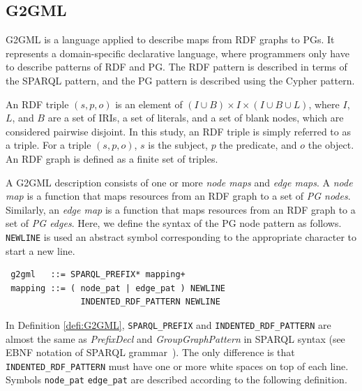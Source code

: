 \documentclass[runningheads]{llncs}
\begin{document}
\subsection{G2GML}

G2GML is a language applied to describe maps from RDF graphs to PGs. It represents a domain-specific declarative language, where programmers only have to describe patterns of RDF and PG. The RDF pattern is described in terms of the SPARQL pattern, and the PG pattern is described using the Cypher pattern.

\begin{prel}
An RDF triple $(s, p, o)$ is an element of $(I \cup B) \times I \times (I \cup B \cup L)$, where $I$, $L$, and $B$ are a set of IRIs, a set of literals, and a set of blank nodes, which are considered pairwise disjoint. In this study, an RDF triple is simply referred to as a triple. For a triple $(s, p, o)$, $s$ is the subject, $p$ the predicate, and $o$ the object. An RDF graph is defined as a finite set of triples.
\end{prel}

\par
A G2GML description consists of one or more \textit{node maps} and \textit{edge maps}.
A \textit{node map} is a function that maps resources from an RDF graph to a set of \textit{PG nodes}. 
Similarly, an \textit{edge map} is a function that maps resources from an RDF graph to a set of \textit{PG edges}.
Here, we define the syntax of the PG node pattern as follows. 
\texttt{NEWLINE} is used an abstract symbol corresponding to the appropriate character to start a new line. 

\begin{defi}
\label{defi:G2GML}
\leavevmode
\begin{verbatim}
 g2gml   ::= SPARQL_PREFIX* mapping+
 mapping ::= ( node_pat | edge_pat ) NEWLINE
               INDENTED_RDF_PATTERN NEWLINE
\end{verbatim}
\end{defi}
In Definition \ref{defi:G2GML}, \texttt{SPARQL\_PREFIX}
 and \texttt{INDENTED\_RDF\_PATTERN} are almost the same as \textit{PrefixDecl} and \textit{GroupGraphPattern} in SPARQL syntax (see EBNF notation of SPARQL grammar~\cite{sparql}).
The only difference is that \texttt{INDENTED\_RDF\_PATTERN} must have one or more white spaces on top of each line.
Symbols \texttt{node\_pat} \texttt{edge\_pat} are described according to the following definition.
\end{document}
